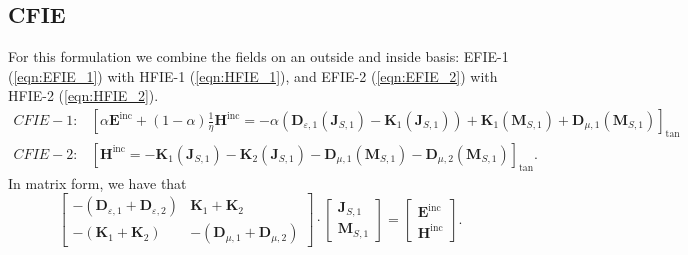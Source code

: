 \documentclass[a4paper,10pt]{book}
\newcommand{\field}[1]{\mathbf{#1}}
\newcommand{\current}[1]{\mathbf{#1}}
\newcommand{\operator}[1]{\mathbf{#1}}
\begin{document}
\subsection{CFIE}
%
\par
For this formulation we combine the fields on an outside and inside basis: EFIE-1 (\ref{eqn:EFIE_1}) with HFIE-1 (\ref{eqn:HFIE_1}), and EFIE-2 (\ref{eqn:EFIE_2}) with HFIE-2 (\ref{eqn:HFIE_2}).
\begin{eqnarray}
CFIE-1: & \boxed{
\left[\alpha \field{E}^\text{inc} + \left(1-\alpha \right) \frac{1}{\eta}\field{H}^\text{inc} =  - \alpha \left(\operator{D}_{\varepsilon, 1}\left(\current{J}_{S,1}\right) - \operator{K}_{1}\left(\current{J}_{S,1}\right) \right) + \operator{K}_{1}\left(\current{M}_{S,1}\right) + \operator{D}_{\mu, 1}\left(\current{M}_{S,1}\right) \right]_\text{tan} } \\
CFIE-2: & \boxed{
\left[\field{H}^\text{inc} = - \operator{K}_{1}\left(\current{J}_{S,1}\right) - \operator{K}_{2}\left(\current{J}_{S,1}\right) - \operator{D}_{\mu, 1}\left(\current{M}_{S,1}\right) - \operator{D}_{\mu, 2}\left(\current{M}_{S,1}\right)  \right]_\text{tan} }.
\end{eqnarray}
In matrix form, we have that
\begin{equation}
\left[
\begin{matrix}
  - \left(\operator{D}_{\varepsilon, 1} + \operator{D}_{\varepsilon, 2} \right) & \operator{K}_{1} + \operator{K}_{2} \\
  -\left(\operator{K}_{1} + \operator{K}_{2} \right) & - \left(\operator{D}_{\mu, 1} + \operator{D}_{\mu, 2}\right)
\end{matrix}
\right]
\cdot 
\left[
\begin{matrix}
  \current{J}_{S,1} \\
  \current{M}_{S,1}  
\end{matrix}
\right]
=
\left[
\begin{matrix}
  \field{E}^\text{inc} \\
  \field{H}^\text{inc}
\end{matrix}
\right].
\end{equation}


\end{document}
